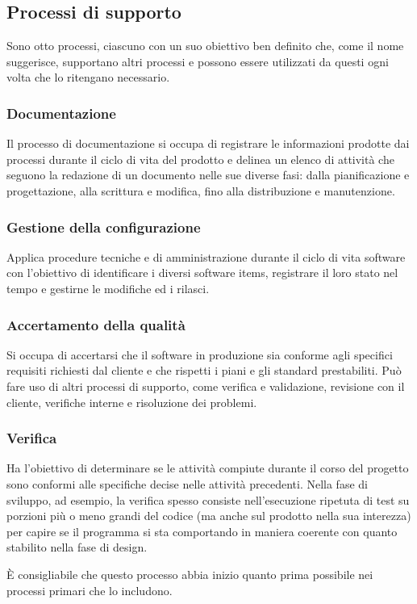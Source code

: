 \subsection{Processi di supporto}
Sono otto processi, ciascuno con un suo obiettivo ben definito che, come il nome suggerisce, supportano altri processi e possono essere utilizzati da questi ogni volta che lo ritengano necessario.

\subsubsection{Documentazione}
Il processo di documentazione si occupa di registrare le informazioni prodotte dai processi durante il ciclo di vita del prodotto e delinea un elenco di attività che seguono la redazione di un documento nelle sue diverse fasi: dalla pianificazione e progettazione, alla scrittura e modifica, fino alla distribuzione e manutenzione.
\subsubsection{Gestione della configurazione}
Applica procedure tecniche e di amministrazione durante il ciclo di vita software con l'obiettivo di identificare i diversi software items, registrare il loro stato nel tempo e gestirne le modifiche ed i rilasci.
\subsubsection{Accertamento della qualità}
Si occupa di accertarsi che il software in produzione sia conforme agli specifici requisiti richiesti dal cliente e che rispetti i piani e gli standard prestabiliti. Può fare uso di altri processi di supporto, come verifica e validazione, revisione con il cliente, verifiche interne e risoluzione dei problemi.
\subsubsection{Verifica}
Ha l'obiettivo di determinare se le attività compiute durante il corso del progetto sono conformi alle specifiche decise nelle attività precedenti. Nella fase di sviluppo, ad esempio, la verifica spesso consiste nell'esecuzione ripetuta di test su porzioni più o meno grandi del codice (ma anche sul prodotto nella sua interezza) per capire se il programma si sta comportando in maniera coerente con quanto stabilito nella fase di design.
\par È consigliabile che questo processo abbia inizio quanto prima possibile nei processi primari che lo includono.
